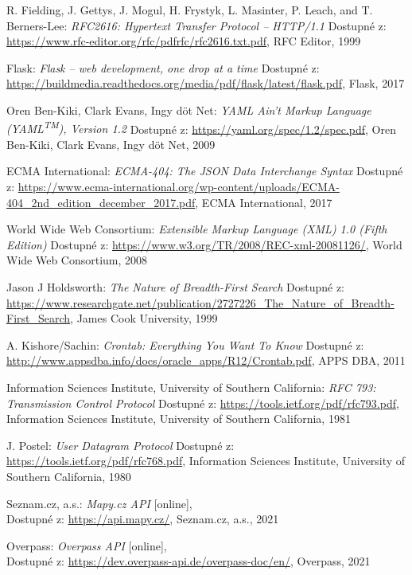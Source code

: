 \documentclass[czech, bachelor]{diploma}
\begin{document}
\begin{thebibliography}{50}
R. Fielding, J. Gettys, J. Mogul, H. Frystyk, L. Masinter, P. Leach, and T. Berners-Lee: \textit{RFC2616: Hypertext Transfer
Protocol -- HTTP/1.1}
Dostupné z:
\url{https://www.rfc-editor.org/rfc/pdfrfc/rfc2616.txt.pdf},
RFC Editor, 1999

Flask: \textit{Flask -- web development, one drop at a time}
Dostupné z:
\url{https://buildmedia.readthedocs.org/media/pdf/flask/latest/flask.pdf},
Flask, 2017

Oren Ben-Kiki, Clark Evans, Ingy döt Net: \textit{YAML Ain't Markup Language (YAML\textsuperscript{TM}), Version 1.2}
Dostupné z:
\url{https://yaml.org/spec/1.2/spec.pdf},
Oren Ben-Kiki, Clark Evans, Ingy döt Net, 2009

ECMA International: \textit{ECMA-404: The JSON Data Interchange Syntax}
Dostupné z:
\url{https://www.ecma-international.org/wp-content/uploads/ECMA-404\_2nd\_edition\_december\_2017.pdf},
ECMA International, 2017

World Wide Web Consortium: \textit{Extensible Markup Language (XML) 1.0 (Fifth Edition)}
Dostupné z:
\url{https://www.w3.org/TR/2008/REC-xml-20081126/},
World Wide Web Consortium, 2008

Jason J Holdsworth: \textit{The Nature of Breadth-First Search}
Dostupné z:
\url{https://www.researchgate.net/publication/2727226\_The\_Nature\_of\_Breadth-First\_Search},
James Cook University, 1999

A. Kishore/Sachin: \textit{Crontab: Everything You Want To Know}
Dostupné z:
\url{http://www.appsdba.info/docs/oracle\_apps/R12/Crontab.pdf},
APPS DBA, 2011

Information Sciences Institute, University of Southern California: \textit{RFC 793: Transmission Control Protocol}
Dostupné z:
\url{https://tools.ietf.org/pdf/rfc793.pdf},
Information Sciences Institute, University of Southern California, 1981

J. Postel: \textit{User Datagram Protocol}
Dostupné z:
\url{https://tools.ietf.org/pdf/rfc768.pdf},
Information Sciences Institute, University of Southern California, 1980

Seznam.cz, a.s.: \textit{Mapy.cz API} [online], \\
Dostupné z:
\url{https://api.mapy.cz/},
Seznam.cz, a.s., 2021

Overpass: \textit{Overpass API} [online], \\
Dostupné z:
\url{https://dev.overpass-api.de/overpass-doc/en/},
Overpass, 2021


\end{thebibliography}
\end{document}
